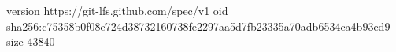 version https://git-lfs.github.com/spec/v1
oid sha256:c75358b0f08e724d38732160738fe2297aa5d7fb23335a70adb6534ca4b93ed9
size 43840
